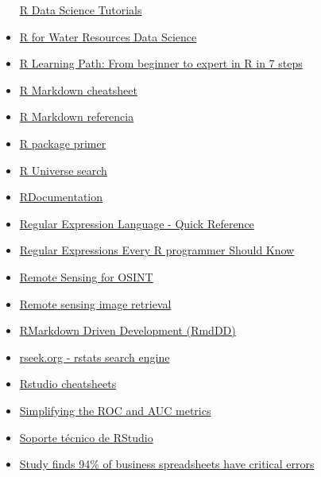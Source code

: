 \documentclass[
]{article}
\begin{document}
\begin{itemize}
  \href{https://github.com/ujjwalkarn/DataScienceR}{R Data Science
  Tutorials}
\item
  \href{https://www.r4wrds.com/}{R for Water Resources Data Science}
\item
  \href{https://www.kdnuggets.com/2016/03/datacamp-r-learning-path-7-steps.html}{R
  Learning Path: From beginner to expert in R in 7 steps}
\item
  \href{https://raw.githubusercontent.com/rstudio/cheatsheets/main/rmarkdown.pdf}{R
  Markdown cheatsheet}
\item
  \href{https://www.rstudio.com/wp-content/uploads/2015/03/rmarkdown-reference.pdf}{R
  Markdown referencia}
\item
  \href{https://kbroman.org/pkg_primer/}{R package primer}
\item
  \href{https://r-universe.dev/search}{R Universe search}
\item
  \href{https://www.rdocumentation.org/}{RDocumentation}
\item
  \href{https://docs.microsoft.com/en-us/dotnet/standard/base-types/regular-expression-language-quick-reference}{Regular
  Expression Language - Quick Reference}
\item
  \href{https://www.r-bloggers.com/regular-expressions-every-r-programmer-should-know/}{Regular
  Expressions Every R programmer Should Know}
\item
  \href{https://bellingcat.github.io/RS4OSINT/}{Remote Sensing for
  OSINT}
\item
  \href{https://github.com/IBM/remote-sensing-image-retrieval}{Remote
  sensing image retrieval}
\item
  \href{https://emilyriederer.netlify.app/post/rmarkdown-driven-development/}{RMarkdown
  Driven Development (RmdDD)}
\item
  \href{https://rseek.org/}{rseek.org - rstats search engine}
\item
  \href{https://www.rstudio.com/resources/cheatsheets/?utm_content=buffer1b56a&utm_medium=social&utm_source=twitter.com&utm_campaign=buffer}{Rstudio
  cheatsheets}
\item
  \href{https://towardsdatascience.com/understanding-the-roc-and-auc-curves-a05b68550b69}{Simplifying
  the ROC and AUC metrics}
\item
  \href{https://support.posit.co/hc/en-us}{Soporte técnico de RStudio}
\item
  \href{https://phys.org/news/2024-08-business-spreadsheets-critical-errors.html}{Study
  finds 94\% of business spreadsheets have critical errors}

\end{itemize}
\end{document}
